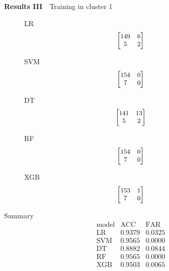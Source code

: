 \documentclass[12pt,aspectratio=43]{beamer}
\begin{document}
\begin{frame}{\textbf{Results III}　{Training in cluster 1}}
\linespread{0.9}
{\small
\begin{figure}[h]
\centering

\begin{minipage}{0.28\linewidth}
\raggedright
{\small LR}
$$
\small
\begin{bmatrix}
149 & 6 \\
5  & 2
\end{bmatrix}
$$
\end{minipage}
\begin{minipage}{0.28\linewidth}
\raggedright
{\small SVM}
$$
\small
\begin{bmatrix}
154 & 0 \\
7  & 0
\end{bmatrix}
$$
\end{minipage}
\begin{minipage}{0.28\linewidth}
\raggedright
{\small DT}
$$
\small
\begin{bmatrix}
141 & 13 \\
5  & 2
\end{bmatrix}
$$
\end{minipage}

\vspace{0.5em}

\begin{minipage}{0.28\linewidth}
\raggedright
{\small RF}
$$
\small
\begin{bmatrix}
154 & 0 \\
7  & 0
\end{bmatrix}
$$
\end{minipage}
\begin{minipage}{0.28\linewidth}
\raggedright
{\small XGB}
$$
\small
\begin{bmatrix}
153 & 1 \\
7  & 0
\end{bmatrix}
$$
\end{minipage}

\end{figure}
}

{\small
Summary
$$
\begin{array}{l|cc}
\text{model} & \text{ACC} & \text{FAR} \\
\hline
\text{LR} & 0.9379 & 0.0325 \\
\text{SVM} & 0.9565 & 0.0000 \\
\text{DT} & 0.8882 & 0.0844\\
\text{RF} & 0.9565 & 0.0000 \\
\text{XGB} & 0.9503 & 0.0065 \\
\end{array}
$$
}

\end{frame}
\end{document}
